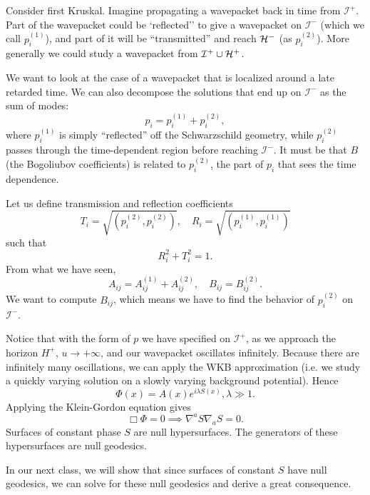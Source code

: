 Consider first Kruskal. Imagine propagating a wavepacket back in time from $\mathcal{I}^+$. Part of the wavepacket could be `reflected'' to give a wavepacket on $\mathcal{I}^-$ (which we call $p_i^{(1)}$), and part of it will be ``transmitted'' and reach $\mathcal H^-$ (as $p_i^{(2)}$). More generally we could study a wavepacket from $\mathcal{I}^+\cup \mathcal H^+$.

We want to look at the case of a wavepacket that is localized around a late retarded time. We can also decompose the solutions that end up on $\mathcal{I}^-$ as the sum of modes:
\begin{equation}
    p_i=p_i^{(1)} +p_i^{(2)},
\end{equation}
where $p_i^{(1)}$ is simply ``reflected'' off the Schwarzschild geometry, while $p_i^{(2)}$ passes through the time-dependent region before reaching $\mathcal{I}^-$. It must be that $B$ (the Bogoliubov coefficients) is related to $p_i^{(2)}$, the part of $p_i$ that sees the time dependence.

Let us define transmission and reflection coefficients
\begin{equation}
    T_i =\sqrt{(p_i^{(2)},p_i^{(2)})},\quad R_i =\sqrt{(p_i^{(1)},p_i^{(1)})}
\end{equation}
such that
\begin{equation}
    R_i^2+T_i^2=1.
\end{equation}
From what we have seen,
\begin{equation}
    A_{ij}=A_{ij}^{(1)}+A_{ij}^{(2)},\quad B_{ij} = B_{ij}^{(2)}.
\end{equation}
We want to compute $B_{ij}$, which means we have to find the behavior of $p_i^{(2)}$ on $\mathcal{I}^-$.

Notice that with the form of $p$ we have specified on $\mathcal{I}^+$, as we approach the horizon $H^+$, $u\to +\infty$, and our wavepacket oscillates infinitely. Because there are infinitely many oscillations, we can apply the WKB approximation (i.e. we study a quickly varying solution on a slowly varying background potential). Hence
\begin{equation}
    \Phi(x) = A(x) e^{i\lambda S(x)},\lambda \gg 1.
\end{equation}
Applying the Klein-Gordon equation gives
\begin{equation}
    \Box \Phi = 0 \implies \nabla^a S \nabla_a S =0.
\end{equation}
Surfaces of constant phase $S$ are null hypersurfaces. The generators of these hypersurfaces are null geodesics.

In our next class, we will show that since surfaces of constant $S$ have null geodesics, we can solve for these null geodesics and derive a great consequence.
